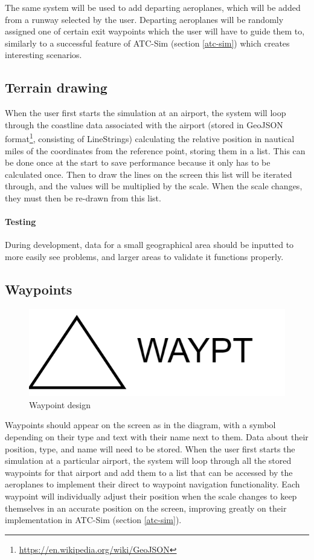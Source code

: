 \documentclass{article}
\begin{document}
The same system will be used to add departing aeroplanes, which will be added from a runway selected by the user.
Departing aeroplanes will be randomly assigned one of certain exit waypoints which the user will have to guide them to, similarly to a successful feature of ATC-Sim (section \ref{atc-sim}) which creates interesting scenarios.

\subsection{Terrain drawing}
When the user first starts the simulation at an airport, the system will loop through the coastline data associated with the airport (stored in GeoJSON format\footnote{\url{https://en.wikipedia.org/wiki/GeoJSON}}, consisting of LineStrings) calculating the relative position in nautical miles of the coordinates from the reference point, storing them in a list.
This can be done once at the start to save performance because it only has to be calculated once.
Then to draw the lines on the screen this list will be iterated through, and the values will be multiplied by the scale.
When the scale changes, they must then be re-drawn from this list.

\paragraph{Testing}
During development, data for a small geographical area should be inputted to more easily see problems, and larger areas to validate it functions properly.


\subsection{Waypoints}
\begin{figure}[H]
\centering
\includegraphics{diagrams/waypointdesign.png}
\caption{\label{fig:waypointdesign}Waypoint design}
\end{figure}

Waypoints should appear on the screen as in the diagram, with a symbol depending on their type and text with their name next to them.
Data about their position, type, and name will need to be stored.
When the user first starts the simulation at a particular airport, the system will loop through all the stored waypoints for that airport and add them to a list that can be accessed by the aeroplanes to implement their direct to waypoint navigation functionality.
Each waypoint will individually adjust their position when the scale changes to keep themselves in an accurate position on the screen, improving greatly on their implementation in ATC-Sim (section \ref{atc-sim}).
\end{document}
